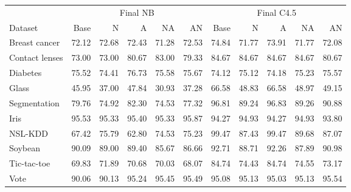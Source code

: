 \begin{tabular}{lrrrrrrrrrr}
\toprule
 & \multicolumn{5}{c}{Final NB} & \multicolumn{5}{c}{Final C4.5} \\
\cmidrule(lr){2-6}\cmidrule(lr){7-11}
Dataset & Base & N & A & NA & AN & Base & N & A & NA & AN \\
\midrule
Breast cancer & 72.12 & 72.68 & 72.43 & 71.28 & 72.53 & 74.84 & 71.77 & 73.91 & 71.77 & 72.08 \\
Contact lenses & 73.00 & 73.00 & 80.67 & 83.00 & 79.33 & 84.67 & 84.67 & 84.67 & 84.67 & 80.67 \\
Diabetes & 75.52 & 74.41 & 76.73 & 75.58 & 75.67 & 74.12 & 75.12 & 74.18 & 75.23 & 75.57 \\
Glass & 45.95 & 37.00 & 47.84 & 30.93 & 37.28 & 66.58 & 48.83 & 66.58 & 48.97 & 49.15 \\
Segmentation & 79.76 & 74.92 & 82.30 & 74.53 & 77.32 & 96.81 & 89.24 & 96.83 & 89.26 & 90.88 \\
Iris & 95.53 & 95.33 & 95.40 & 95.33 & 95.87 & 94.27 & 94.93 & 94.27 & 94.93 & 93.80 \\
NSL-KDD & 67.42 & 75.79 & 62.80 & 74.53 & 75.23 & 99.47 & 87.43 & 99.47 & 89.68 & 87.07 \\
Soybean & 90.09 & 89.00 & 89.40 & 85.67 & 86.66 & 92.71 & 88.71 & 92.26 & 87.89 & 90.98 \\
Tic-tac-toe & 69.83 & 71.89 & 70.68 & 70.03 & 68.07 & 84.74 & 74.43 & 84.74 & 74.55 & 73.17 \\
Vote & 90.06 & 90.13 & 95.24 & 95.45 & 95.49 & 95.08 & 95.13 & 95.03 & 95.13 & 95.54 \\
\bottomrule
\end{tabular}
